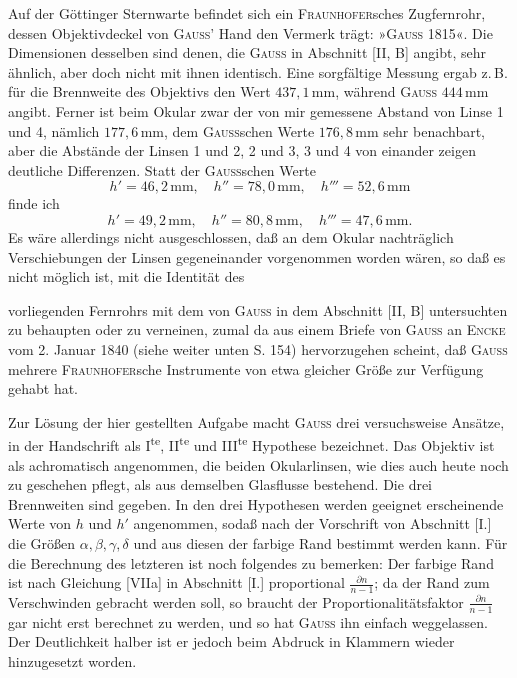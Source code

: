 \newpage
Auf der Göttinger Sternwarte befindet sich ein \textsc{Fraunhofer}sches Zugfernrohr, dessen Objektivdeckel von \textsc{Gauss}' Hand den Vermerk trägt: »\textsc{Gauss} 1815«. Die Dimensionen desselben sind denen, die \textsc{Gauss} in Abschnitt [II, B] angibt, sehr ähnlich, aber doch nicht mit ihnen identisch. Eine sorgfältige Messung ergab z.\,B. für die Brennweite des Objektivs den Wert $437{,}1\,\mathrm{mm}$, während \textsc{Gauss} $444\,\mathrm{mm}$ angibt. Ferner ist beim Okular zwar der von mir gemessene Abstand von Linse 1 und 4, nämlich $177{,}6\,\mathrm{mm}$, dem \textsc{Gauss}schen Werte $176{,}8\,\mathrm{mm}$ sehr benachbart, aber die Abstände der Linsen 1 und 2, 2 und 3, 3 und 4 von einander zeigen deutliche Differenzen. Statt der \textsc{Gauss}schen Werte
\[
h'=46{,}2\,\mathrm{mm},\quad h''=78{,}0\,\mathrm{mm},\quad h'''=52{,}6\,\mathrm{mm}
\]
\noindent finde ich
\[
h'=49{,}2\,\mathrm{mm},\quad h''=80{,}8\,\mathrm{mm},\quad h'''=47{,}6\,\mathrm{mm}.
\]
\noindent Es wäre allerdings nicht ausgeschlossen, daß an dem Okular nachträglich Verschiebungen der Linsen gegeneinander vorgenommen worden wären, so daß es nicht möglich ist, mit  die Identität des
\par{}
\clearpage{}
\noindent vorliegenden Fernrohrs mit dem von \textsc{Gauss} in dem Abschnitt [II, B] untersuchten zu behaupten oder zu verneinen, zumal da aus einem Briefe von \textsc{Gauss} an \textsc{Encke} vom 2. Januar 1840 (siehe weiter unten S. 154) hervorzugehen scheint, daß \textsc{Gauss} mehrere \textsc{Fraunhofer}sche Instrumente von etwa gleicher Größe zur Verfügung gehabt hat.
\begin{center}\end{center}
\noindent\hspace*{\parindent}Zur Lösung der hier gestellten Aufgabe macht \textsc{Gauss} drei versuchsweise Ansätze, in der Handschrift als I\textsuperscript{te}, II\textsuperscript{te} und III\textsuperscript{te} Hypothese bezeichnet. Das Objektiv ist als achromatisch angenommen, die beiden Okularlinsen, wie dies auch heute noch zu geschehen pflegt, als aus demselben Glasflusse bestehend. Die drei Brennweiten sind gegeben. In den drei Hypothesen werden geeignet erscheinende Werte von $h$ und $h'$ angenommen, sodaß nach der Vorschrift von Abschnitt [I.] die Größen $\alpha,\beta,\gamma,\delta$ und aus diesen der farbige Rand bestimmt werden kann. Für die Berechnung des letzteren ist noch folgendes zu bemerken: Der farbige Rand ist nach Gleichung [VIIa] in Abschnitt [I.] proportional $\frac{\partial n}{n-1}$; da der Rand zum Verschwinden gebracht werden soll, so braucht der Proportionalitätsfaktor $\frac{\partial n}{n-1}$ gar nicht erst berechnet zu werden, und so hat \textsc{Gauss} ihn einfach weggelassen. Der Deutlichkeit halber ist er jedoch beim Abdruck in Klammern wieder hinzugesetzt worden.


